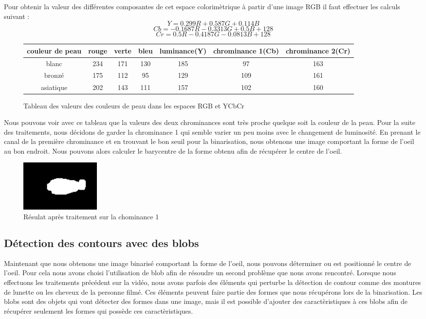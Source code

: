 Pour obtenir la valeur des différentes composantes de cet espace colorimètrique à partir
d'une image RGB il faut effectuer les calculs suivant :
$$Y = 0.299R + 0.587 G + 0.114 B$$
$$Cb = -0.1687R - 0.3313 G + 0.5B + 128$$
$$Cr = 0.5R -0.4187G -0.0813B + 128$$

\begin{figure}[H]
 \begin{tabular}{|c|c|c|c|c|c|c|}
  \hline
  couleur de peau & rouge & verte & bleu & luminance(Y) & chrominance 1(Cb) & chrominance 2(Cr)\\
  \hline
  blanc & 234 & 171 & 130 & 185 & 97 & 163 \\
  \hline
  bronzé & 175 & 112 & 95 & 129 & 109 & 161 \\
  \hline
  asiatique & 202 & 143 & 111 & 157 & 102 & 160\\
  \hline
 \end{tabular}
 \caption{Tableau des valeurs des couleurs de peau dans les espaces RGB et YCbCr}
\end{figure}

Nous pouvons voir avec ce tableau que la valeurs des deux chrominances sont très proche quelque soit
la couleur de la peau. Pour la suite des traitements, nous décidons de garder la chrominance 1 qui semble
varier un peu moins avec le changement de luminosité. En prenant le canal de la première chrominance et en 
trouvant le bon seuil pour la binarisation, nous obtenons une image comportant la forme de l'oeil au bon endroit.
Nous pouvons alors calculer le barycentre de la forme obtenu afin de récupérer le centre de l'oeil.

\begin{figure}[H]
 \center
 \includegraphics[width=4cm]{image/result_yuv.png}
 \caption{Résulat après traitement sur la chominance 1}
\end{figure}

\subsection{Détection des contours avec des blobs}
Maintenant que nous obtenons une image binarisé comportant la forme de l'oeil, nous pouvons déterminer ou est
positionné le centre de l'oeil. Pour cela nous avons choisi l'utilisation de blob afin de résoudre un second 
problème que nous avons rencontré. Lorsque nous effectuons les traitements précédent sur la vidéo, nous avons
parfois des éléments qui perturbe la détection de contour comme des montures de lunette ou les cheveux de la personne 
filmé. Ces éléments peuvent faire partie des formes que nous récupérons lors de la binarisation. Les blobs
sont des objets qui vont détecter des formes dans une image, mais il est possible d'ajouter des caractèristiques
à ces blobs afin de récupérer seulement les formes qui possède ces caractèristiques.\\

